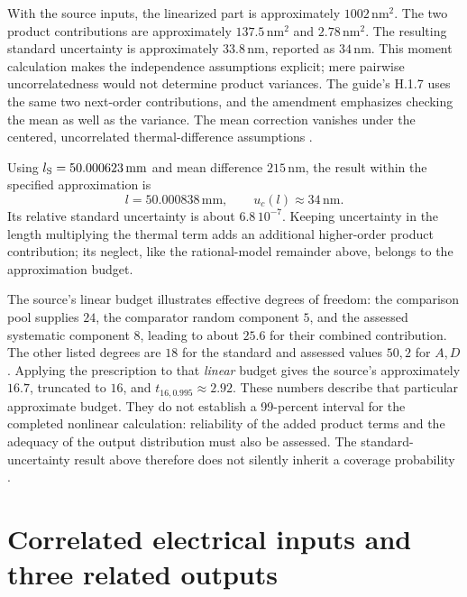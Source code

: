 With the source inputs, the linearized part is approximately
\(1002\,\mathrm{nm}^2\). The two product contributions are approximately
\(137.5\,\mathrm{nm}^2\) and \(2.78\,\mathrm{nm}^2\).
The resulting standard uncertainty is approximately \(33.8\,\mathrm{nm}\),
reported as \(34\,\mathrm{nm}\). This moment calculation makes the
independence assumptions explicit; mere pairwise uncorrelatedness would not
determine product variances. The guide's H.1.7 uses the same two
next-order contributions, and the amendment emphasizes checking the mean
as well as the variance. The mean correction vanishes under the centered,
uncorrelated thermal-difference assumptions
\cite[H.1.7]{JCGM1002008EMeasurement}
\cite{JCGM100Amendment2026Nonlinearity}.

Using \(l_{\rm S}=50.000623\,\mathrm{mm}\) and mean difference
\(215\,\mathrm{nm}\), the result within the specified approximation is
\[
 l=50.000838\,\mathrm{mm},\qquad u_c(l)\approx34\,\mathrm{nm}.
\]
Its relative standard uncertainty is about \(6.8\,10^{-7}\).
Keeping uncertainty in the length multiplying the thermal term adds an
additional higher-order product contribution; its neglect, like the
rational-model remainder above, belongs to the approximation budget.

The source's linear budget illustrates effective degrees of freedom:
the comparison pool supplies \(24\), the comparator random component \(5\),
and the assessed systematic component \(8\), leading to about \(25.6\)
for their combined contribution. The other listed degrees are \(18\) for
the standard and assessed values \(50,2\) for \(A,D\).
Applying the prescription to that \emph{linear} budget gives the source's
approximately \(16.7\), truncated to \(16\), and \(t_{16,0.995}\approx2.92\).
These numbers describe that particular approximate budget.
They do not establish a 99-percent interval for the completed nonlinear
calculation: reliability of the added product terms and the adequacy of the
output distribution must also be assessed. The standard-uncertainty result
above therefore does not silently inherit a coverage probability
\cite[H.1.6--H.1.7]{JCGM1002008EMeasurement}.

\section{Correlated electrical inputs and three related outputs}
\label{sec:p15-measurement-impedance}

